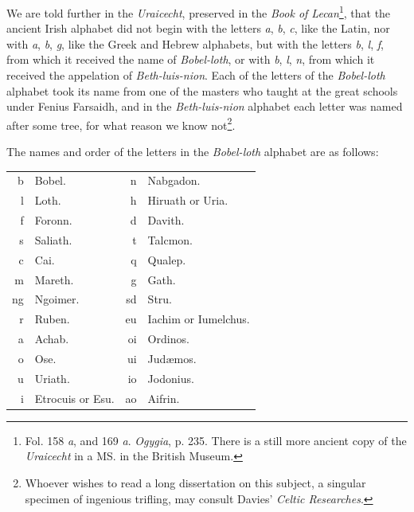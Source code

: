 \documentclass[11pt,oneside]{memoir}
\begin{document}
We are told further in the \textit{Uraicecht}, preserved in the \textit{Book of Lecan}\footnote{
    Fol. 158 \textit{a}, and 169 \textit{a}. \textit{Ogygia}, p. 235.
    There is a still more ancient copy of the \textit{Uraicecht} in a MS. in the British Museum.
}, that the ancient Irish alphabet did not begin with the letters \textit{a}, \textit{b}, \textit{c}, like the Latin, nor with \textit{a}, \textit{b}, \textit{g}, like the Greek and Hebrew alphabets, but with the letters \textit{b}, \textit{l}, \textit{f}, from which it received the name of \textit{Bobel-loth}, or with \textit{b}, \textit{l}, \textit{n}, from which it received the appelation of \textit{Beth-luis-nion}.
Each of the letters of the \textit{Bobel-loth} alphabet took its name from one of the masters who taught at the great schools under Fenius Farsaidh, and in the \textit{Beth-luis-nion} alphabet each letter was named after some tree, for what reason we know not\footnote{
    Whoever wishes to read a long dissertation on this subject, a singular specimen of ingenious trifling, may consult Davies' \textit{Celtic Researches}.
}.

The names and order of the letters in the \textit{Bobel-loth} alphabet are as follows:

\begin{tabularx}{\textwidth}{r X r X} 
\gaelicfont b & \normalfont Bobel. & \gaelicfont n & \normalfont Nabgadon. \\
\gaelicfont l & \normalfont Loth. & \gaelicfont h & \normalfont Hiruath or Uria. \\
\gaelicfont f & \normalfont Foronn. & \gaelicfont d & \normalfont Davith. \\
\gaelicfont s & \normalfont Saliath. & \gaelicfont t & \normalfont Talcmon. \\
\gaelicfont c & \normalfont Cai. & \gaelicfont q & \normalfont Qualep. \\
\gaelicfont m & \normalfont Mareth. & \gaelicfont g & \normalfont Gath. \\
\gaelicfont ng & \normalfont Ngoimer. & \gaelicfont sd & \normalfont Stru. \\

\gaelicfont r & \normalfont Ruben. & \gaelicfont eu & \normalfont Iachim or Iumelchus. \\
\gaelicfont a & \normalfont Achab. & \gaelicfont oi & \normalfont Ordinos. \\
\gaelicfont o & \normalfont Ose. & \gaelicfont ui & \normalfont Jud{\ae}mos. \\
\gaelicfont u & \normalfont Uriath. & \gaelicfont io & \normalfont Jodonius. \\
\gaelicfont i & \normalfont Etrocuis or Esu. & \gaelicfont ao & \normalfont Aifrin. \\
\end{tabularx}
\end{document}
